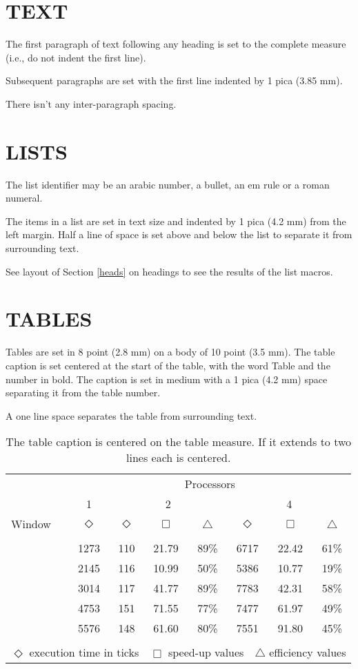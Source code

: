 \documentclass{ecai2014}
\begin{document}
\section{TEXT}
The first paragraph of text following any heading is set to the
complete measure (i.e., do not indent the first line).

Subsequent paragraphs are set with the first line indented
by 1 pica (3.85 mm).

There isn't any inter-paragraph spacing.

\section{LISTS}
The list identifier may be an arabic number, a bullet, an em
rule or a roman numeral.

The items in a list are set in text size and indented by 1
pica (4.2 mm) from the left margin. Half a line of space is
set above and below the list to separate it from surrounding
text.

See layout of Section \ref{heads} on headings to see the results of the list macros.

\section{TABLES}
Tables are set in 8 point (2.8 mm) on a body of 10 point (3.5 mm).
The table caption is set centered at the start of the table, with
the word Table and the number in bold. The caption is set in medium
with a 1 pica (4.2 mm) space separating it from the table number.

A one line space separates the table from surrounding text.

\begin{table}
\begin{center}
{\caption{The table caption is centered on the table measure. If it
extends to two lines each is centered.}\label{table1}}
\begin{tabular}{lccccccc}
\hline
\rule{0pt}{12pt}
&\multicolumn{7}{c}{Processors}\\
&1&\multicolumn{3}{c}{2}&\multicolumn{3}{c}{4}\\
\cline{2-8}
\rule{0pt}{12pt}
Window&$\Diamond$&$\Diamond$&$\Box$&$\bigtriangleup$&$\Diamond$&$\Box$&$\bigtriangleup$
\\
\hline
\\[-6pt]
\quad1&1273&110&21.79&89\%&6717&22.42&61\%\\
\quad2&2145&116&10.99&50\%&5386&10.77&19\%\\
\quad3&3014&117&41.77&89\%&7783&42.31&58\%\\
\quad4&4753&151&71.55&77\%&7477&61.97&49\%\\
\quad5&5576&148&61.60&80\%&7551&91.80&45\%
\\
\hline
\\[-6pt]
\multicolumn{8}{l}{$\Diamond$ execution time in ticks\ \
$\Box$ speed-up values\ \
$\bigtriangleup$ efficiency values}
\end{tabular}
\end{center}
\end{table}
\end{document}
